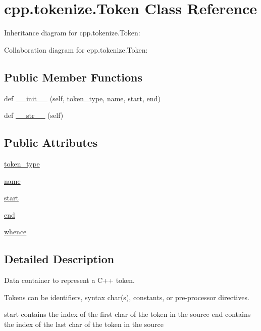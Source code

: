 \hypertarget{classcpp_1_1tokenize_1_1_token}{}\section{cpp.\+tokenize.\+Token Class Reference}
\label{classcpp_1_1tokenize_1_1_token}


Inheritance diagram for cpp.\+tokenize.\+Token\+:


Collaboration diagram for cpp.\+tokenize.\+Token\+:
\subsection*{Public Member Functions}
\begin{DoxyCompactItemize}
\item 
def \hyperlink{classcpp_1_1tokenize_1_1_token_a7da7659a5a6c61d0f4b8590cf96e19fd}{\+\_\+\+\_\+init\+\_\+\+\_\+} (self, \hyperlink{classcpp_1_1tokenize_1_1_token_a60c6e5120f3947885f10788ceb69a660}{token\+\_\+type}, \hyperlink{classcpp_1_1tokenize_1_1_token_a90859dd16bde71bc38f717f5119e63b9}{name}, \hyperlink{classcpp_1_1tokenize_1_1_token_a8ec48e348ff29901857cb21553da464b}{start}, \hyperlink{classcpp_1_1tokenize_1_1_token_a9935738c382352eca19834c2533715db}{end})
\item 
def \hyperlink{classcpp_1_1tokenize_1_1_token_a98e024051039637a18601fcbb0232cc2}{\+\_\+\+\_\+str\+\_\+\+\_\+} (self)
\end{DoxyCompactItemize}
\subsection*{Public Attributes}
\begin{DoxyCompactItemize}
\item 
\hyperlink{classcpp_1_1tokenize_1_1_token_a60c6e5120f3947885f10788ceb69a660}{token\+\_\+type}
\item 
\hyperlink{classcpp_1_1tokenize_1_1_token_a90859dd16bde71bc38f717f5119e63b9}{name}
\item 
\hyperlink{classcpp_1_1tokenize_1_1_token_a8ec48e348ff29901857cb21553da464b}{start}
\item 
\hyperlink{classcpp_1_1tokenize_1_1_token_a9935738c382352eca19834c2533715db}{end}
\item 
\hyperlink{classcpp_1_1tokenize_1_1_token_a9d3a8011707ede6be85987d74f88848d}{whence}
\end{DoxyCompactItemize}


\subsection{Detailed Description}
\begin{DoxyVerb}Data container to represent a C++ token.

Tokens can be identifiers, syntax char(s), constants, or
pre-processor directives.

start contains the index of the first char of the token in the source
end contains the index of the last char of the token in the source
\end{DoxyVerb}
 

